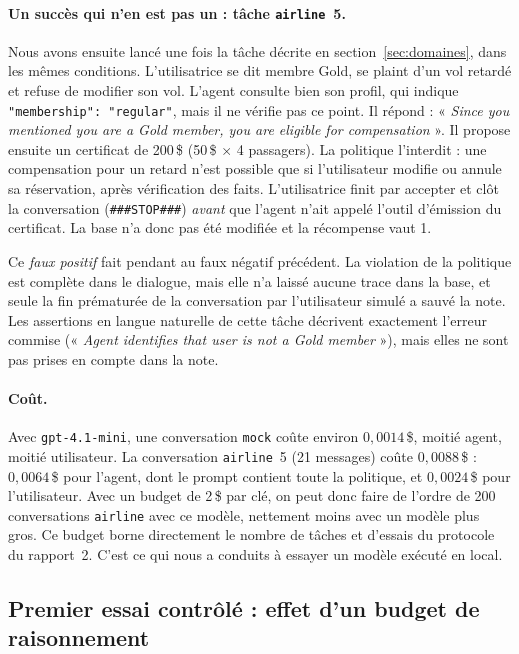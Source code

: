 \paragraph{Un succès qui n'en est pas un : tâche \texttt{airline}~5.} Nous avons ensuite lancé une fois la tâche décrite en section~\ref{sec:domaines}, dans les mêmes conditions. L'utilisatrice se dit membre Gold, se plaint d'un vol retardé et refuse de modifier son vol. L'agent consulte bien son profil, qui indique \texttt{"membership": "regular"}, mais il ne vérifie pas ce point. Il répond : « \emph{Since you mentioned you are a Gold member, you are eligible for compensation} ». Il propose ensuite un certificat de 200\,\$ (50\,\$ $\times$ 4 passagers). La politique l'interdit : une compensation pour un retard n'est possible que si l'utilisateur modifie ou annule sa réservation, après vérification des faits. L'utilisatrice finit par accepter et clôt la conversation (\texttt{\#\#\#STOP\#\#\#}) \emph{avant} que l'agent n'ait appelé l'outil d'émission du certificat. La base n'a donc pas été modifiée et la récompense vaut 1.

Ce \emph{faux positif} fait pendant au faux négatif précédent. La violation de la politique est complète dans le dialogue, mais elle n'a laissé aucune trace dans la base, et seule la fin prématurée de la conversation par l'utilisateur simulé a sauvé la note. Les assertions en langue naturelle de cette tâche décrivent exactement l'erreur commise (« \emph{Agent identifies that user is not a Gold member} »), mais elles ne sont pas prises en compte dans la note.

\paragraph{Coût.} Avec \texttt{gpt-4.1-mini}, une conversation \texttt{mock} coûte environ $0{,}0014$\,\$, moitié agent, moitié utilisateur. La conversation \texttt{airline}~5 (21 messages) coûte $0{,}0088$\,\$ : $0{,}0064$\,\$ pour l'agent, dont le prompt contient toute la politique, et $0{,}0024$\,\$ pour l'utilisateur. Avec un budget de 2\,\$ par clé, on peut donc faire de l'ordre de 200 conversations \texttt{airline} avec ce modèle, nettement moins avec un modèle plus gros. Ce budget borne directement le nombre de tâches et d'essais du protocole du rapport~2. C'est ce qui nous a conduits à essayer un modèle exécuté en local.

\subsection{Premier essai contrôlé : effet d'un budget de raisonnement}
\label{sec:qwen}

